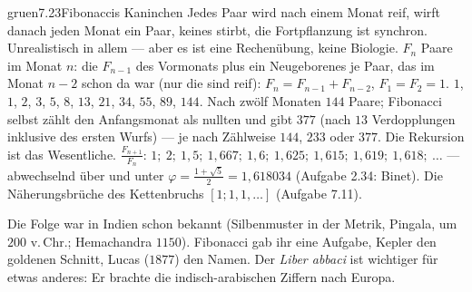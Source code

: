 \begin{loesungkarte}{gruen}{7.23}{Fibonaccis Kaninchen}
Jedes Paar wird nach einem Monat reif, wirft danach jeden Monat ein Paar, keines stirbt, die Fortpflanzung ist synchron. Unrealistisch in allem --- aber es ist eine Rechenübung, keine Biologie.
$F_n$ Paare im Monat $n$: die $F_{n-1}$ des Vormonats plus ein Neugeborenes je Paar, das im Monat $n - 2$ schon da war (nur die sind reif): $F_n = F_{n-1} + F_{n-2}$, $F_1 = F_2 = 1$.
$1$, $1$, $2$, $3$, $5$, $8$, $13$, $21$, $34$, $55$, $89$, $144$. Nach zwölf Monaten $144$ Paare; Fibonacci selbst zählt den Anfangsmonat als nullten und gibt $377$ (nach $13$ Verdopplungen inklusive des ersten Wurfs) --- je nach Zählweise $144$, $233$ oder $377$. Die Rekursion ist das Wesentliche.
$\frac{F_{n+1}}{F_n}$: $1;\ 2;\ 1{,}5;\ 1{,}667;\ 1{,}6;\ 1{,}625;\ 1{,}615;\ 1{,}619;\ 1{,}618;\ \dots$ --- abwechselnd über und unter $\varphi = \frac{1 + \sqrt5}2 = 1{,}618034$ (Aufgabe 2.34: Binet). Die Näherungsbrüche des Kettenbruchs $[1; 1, 1, \dots]$ (Aufgabe 7.11).
\begin{mitnehmen}\kastentext
Die Folge war in Indien schon bekannt (Silbenmuster in der Metrik, Pingala, um $200$ v.\,Chr.; Hemachandra $1150$). Fibonacci gab ihr eine Aufgabe, Kepler den goldenen Schnitt, Lucas ($1877$) den Namen. Der \emph{Liber abbaci} ist wichtiger für etwas anderes: Er brachte die indisch-arabischen Ziffern nach Europa.
\end{mitnehmen}
\end{loesungkarte}

